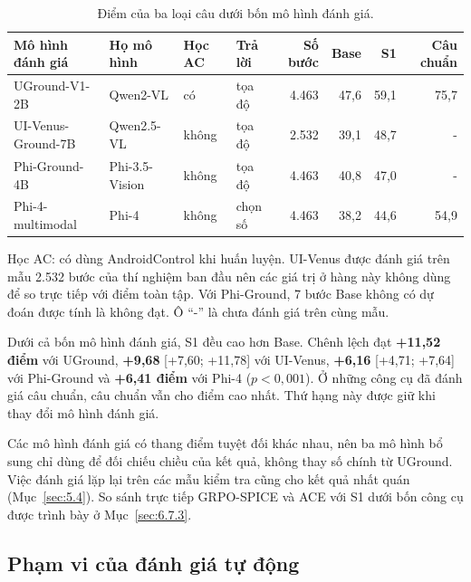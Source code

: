 \begin{table}[htbp]
\centering\small
\caption{Điểm của ba loại câu dưới bốn mô hình đánh giá.}\label{tab:5.5}\label{tab:5.4}\label{tab:5.4b}
\setlength{\tabcolsep}{3.5pt}
\begin{tabular}{@{}llllrrrr@{}}
\toprule
\textbf{Mô hình đánh giá} & \textbf{Họ mô hình} & \textbf{Học AC} & \textbf{Trả lời} & \textbf{Số bước} & \textbf{Base} & \textbf{S1} & \textbf{Câu chuẩn} \\
\midrule
UGround-V1-2B & Qwen2-VL & có & tọa độ & 4.463 & 47,6 & 59,1 & 75,7 \\
UI-Venus-Ground-7B & Qwen2.5-VL & không & tọa độ & 2.532 & 39,1 & 48,7 & - \\
Phi-Ground-4B & Phi-3.5-Vision & không & tọa độ & 4.463 & 40,8 & 47,0 & - \\
Phi-4-multimodal & Phi-4 & không & chọn số & 4.463 & 38,2 & 44,6 & 54,9 \\
\bottomrule
\end{tabular}

\smallskip
\begin{minipage}{\linewidth}\footnotesize Học AC: có dùng AndroidControl khi huấn luyện. UI-Venus được đánh giá trên mẫu 2.532 bước của thí nghiệm ban đầu nên các giá trị ở hàng này không dùng để so trực tiếp với điểm toàn tập. Với Phi-Ground, 7 bước Base không có dự đoán được tính là không đạt. Ô ``-'' là chưa đánh giá trên cùng mẫu.\end{minipage}
\end{table}

Dưới cả bốn mô hình đánh giá, S1 đều cao hơn Base. Chênh lệch đạt \textbf{+11,52 điểm} với UGround, \textbf{+9,68} [+7,60; +11,78] với UI-Venus, \textbf{+6,16} [+4,71; +7,64] với Phi-Ground và \textbf{+6,41 điểm} với Phi-4 ($p < 0{,}001$). Ở những công cụ đã đánh giá câu chuẩn, câu chuẩn vẫn cho điểm cao nhất. Thứ hạng này được giữ khi thay đổi mô hình đánh giá.

Các mô hình đánh giá có thang điểm tuyệt đối khác nhau, nên ba mô hình bổ sung chỉ dùng để đối chiếu chiều của kết quả, không thay số chính từ UGround. Việc đánh giá lặp lại trên các mẫu kiểm tra cũng cho kết quả nhất quán (Mục~\ref{sec:5.4}). So sánh trực tiếp GRPO-SPICE và ACE với S1 dưới bốn công cụ được trình bày ở Mục~\ref{sec:6.7.3}.

\subsection{Phạm vi của đánh giá tự động}\label{sec:5.3}

